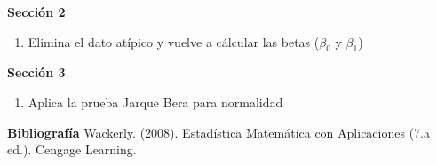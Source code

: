 \documentclass{../oxmathproblems}
\begin{document}
\begin{questions}
\textbf {Sección 2} 
\begin{enumerate}
  \item Elimina el dato atípico y vuelve a cálcular las betas ($\beta_0$ y $\beta_1$)
\end{enumerate}

\textbf {Sección 3} 
\begin{enumerate}
  \item Aplica la prueba Jarque Bera para normalidad 
\end{enumerate}



\textbf{Bibliografía}
Wackerly. (2008). Estadística Matemática con Aplicaciones (7.a ed.). Cengage Learning.



\end{questions}
\end{document}
